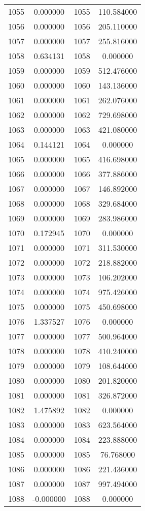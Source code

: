 \documentclass[12pt]{article}
\begin{document}
\begin{longtable}{@{}cccc@{}}
1055 & 0.000000 & 1055 & 110.584000 \\
1056 & 0.000000 & 1056 & 205.110000 \\
1057 & 0.000000 & 1057 & 255.816000 \\
1058 & 0.634131 & 1058 & 0.000000 \\
1059 & 0.000000 & 1059 & 512.476000 \\
1060 & 0.000000 & 1060 & 143.136000 \\
1061 & 0.000000 & 1061 & 262.076000 \\
1062 & 0.000000 & 1062 & 729.698000 \\
1063 & 0.000000 & 1063 & 421.080000 \\
1064 & 0.144121 & 1064 & 0.000000 \\
1065 & 0.000000 & 1065 & 416.698000 \\
1066 & 0.000000 & 1066 & 377.886000 \\
1067 & 0.000000 & 1067 & 146.892000 \\
1068 & 0.000000 & 1068 & 329.684000 \\
1069 & 0.000000 & 1069 & 283.986000 \\
1070 & 0.172945 & 1070 & 0.000000 \\
1071 & 0.000000 & 1071 & 311.530000 \\
1072 & 0.000000 & 1072 & 218.882000 \\
1073 & 0.000000 & 1073 & 106.202000 \\
1074 & 0.000000 & 1074 & 975.426000 \\
1075 & 0.000000 & 1075 & 450.698000 \\
1076 & 1.337527 & 1076 & 0.000000 \\
1077 & 0.000000 & 1077 & 500.964000 \\
1078 & 0.000000 & 1078 & 410.240000 \\
1079 & 0.000000 & 1079 & 108.644000 \\
1080 & 0.000000 & 1080 & 201.820000 \\
1081 & 0.000000 & 1081 & 326.872000 \\
1082 & 1.475892 & 1082 & 0.000000 \\
1083 & 0.000000 & 1083 & 623.564000 \\
1084 & 0.000000 & 1084 & 223.888000 \\
1085 & 0.000000 & 1085 & 76.768000 \\
1086 & 0.000000 & 1086 & 221.436000 \\
1087 & 0.000000 & 1087 & 997.494000 \\
1088 & -0.000000 & 1088 & 0.000000 \\

\end{longtable}
\end{document}
